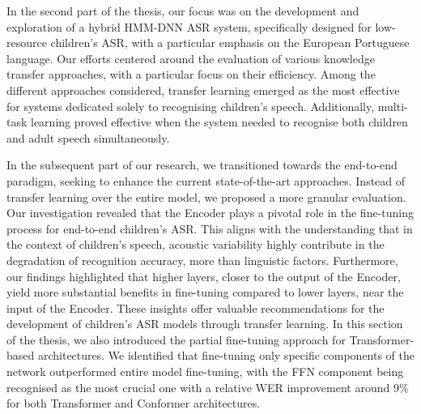In the second part of the thesis, our focus was on the development and exploration of a hybrid HMM-DNN ASR system, specifically designed for low-resource children's ASR, with a particular emphasis on the European Portuguese language. Our efforts centered around the evaluation of various knowledge transfer approaches, with a particular focus on their efficiency. Among the different approaches considered, transfer learning emerged as the most effective for systems dedicated solely to recognising children's speech. Additionally, multi-task learning proved effective when the system needed to recognise both children and adult speech simultaneously.

In the subsequent part of our research, we transitioned towards the end-to-end paradigm, seeking to enhance the current state-of-the-art approaches. Instead of transfer learning over the entire model, we proposed a more granular evaluation. Our investigation revealed that the Encoder plays a pivotal role in the fine-tuning process for end-to-end children's ASR. This aligns with the understanding that in the context of children's speech, acoustic variability highly contribute in the degradation of recognition accuracy, more than linguistic factors. Furthermore, our findings highlighted that higher layers, closer to the output of the Encoder, yield more substantial benefits in fine-tuning compared to lower layers, near the input of the Encoder. These insights offer valuable recommendations for the development of children's ASR models through transfer learning. In this section of the thesis, we also introduced the partial fine-tuning approach for Transformer-based architectures. We identified that fine-tuning only specific components of the network outperformed entire model fine-tuning, with the FFN component being recognised as the most crucial one with a relative WER improvement around 9\% for both Transformer and Conformer architectures.

